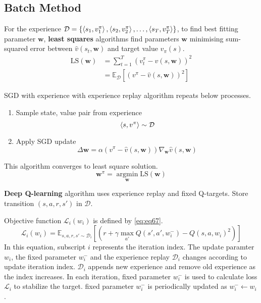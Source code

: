 \documentclass[
	10pt, %
]{article}
\theoremstyle{plain}
\newcommand{\mbb}[1]{\mathbb{#1}}
\newcommand{\mb}[1]{\mathbf{#1}}
\newcommand{\mc}[1]{\mathcal{#1}}
\newcommand{\tb}[1]{\textbf{#1}}
\numberwithin{equation}{subsection} %
\newcommand{\argmin}{\mathop{\mathrm{argmin}}\limits}
\begin{document}
\subsection{Batch Method}
For the experience $\mc{D} = \{\braket{s_1,v_1^\pi}, \braket{s_2,v_2^\pi}, \dots, \braket{s_T, v_T^\pi}\}$, to find best fitting parameter $\mb{w}$, \tb{least squares} algorithms find parameters $\mb{w}$ minimising sum-squared error between $\hat{v}(s_t, \mb{w})$ and target value $v_\pi(s)$.
\begin{equation} \label{eq:eq66}
    \begin{aligned}
    \text{LS}(\mb{w}) &= \sum_{t=1}^T (v^\pi_t - \hat{v}(s, \mb{w}))^2\\
    &= \mbb{E}_\mc{D} [(v^\pi - \hat{v}(s,\mb{w}))^2]
    \end{aligned}
\end{equation}

SGD with experience with experience replay algorithm repeats below processes.
\begin{enumerate}
    \item Sample state, value pair from experience
    $$\braket{s, v^\pi} \sim \mc{D}$$
    \item Apply SGD update
    $$\Delta \mb{w} = \alpha(v^\pi - \hat{v}(s, \mb{w}))\nabla_\mb{w} \hat{v}(s, \mb{w})$$
\end{enumerate}
This algorithm converges to least square solution. $$\mb{w}^\pi = \argmin_\mb{w} \text{LS}(\mb{w})$$

\tb{Deep Q-learning} algorithm uses experience replay and fixed Q-targets.
Store transition $(s,a,r,s')$ in $\mc{D}$.

Objective function $\mc{L}_i(w_i)$ is defined by \cref{eq:eq67}.
\begin{equation} \label{eq:eq67}
    \mc{L}_i(w_i) = \mbb{E}_{s,a,r,s' \sim \mc{D}_i} \left[\left(r + \gamma \max_{a'}Q(s',a',w_i^-)-Q(s,a,w_i)^2\right)\right]
\end{equation}
In this equation, subscript $i$ represents the iteration index. The update paramter $w_i$, the fixed parameter $w_i^-$ and the experience replay $\mc{D}_i$ changes according to update iteration index. 
$\mc{D}_i$ appends new experience and remove old experience as the index increases.
In each iteration, fixed parameter $w_i^-$ is used to calculate loss $\mc{L}_i$ to stabilize the target. fixed parameter $w_i^-$ is periodically updated as $w_i^- \gets w_i$.
\end{document}
